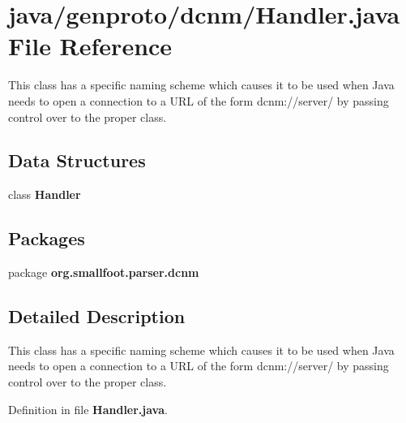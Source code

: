 \section{java/genproto/dcnm/\+Handler.java File Reference}
\label{dcnm_2Handler_8java}


This class has a specific naming scheme which causes it to be used when Java needs to open a connection to a U\+R\+L of the form dcnm\+://server/ by passing control over to the proper class.  


\subsection*{Data Structures}
\begin{DoxyCompactItemize}
\item 
class {\bf Handler}
\end{DoxyCompactItemize}
\subsection*{Packages}
\begin{DoxyCompactItemize}
\item 
package {\bf org.\+smallfoot.\+parser.\+dcnm}
\end{DoxyCompactItemize}


\subsection{Detailed Description}
This class has a specific naming scheme which causes it to be used when Java needs to open a connection to a U\+R\+L of the form dcnm\+://server/ by passing control over to the proper class. 



Definition in file {\bf Handler.\+java}.

